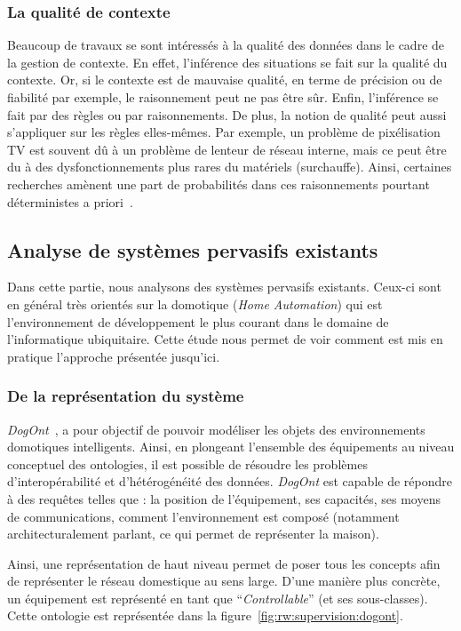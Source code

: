 \subsubsection{La qualité de contexte}
Beaucoup de travaux se sont intéressés à la qualité des données dans le cadre de la gestion de contexte. En effet, l'inférence des situations se fait sur la qualité du contexte. Or, si le contexte est de mauvaise qualité, en terme de précision ou de fiabilité par exemple, le raisonnement peut ne pas être sûr. Enfin, l'inférence se fait par des règles ou par raisonnements. De plus, la notion de qualité peut aussi s'appliquer sur les règles elles-mêmes. Par exemple, un problème de pixélisation TV est souvent dû à un problème de lenteur de réseau interne, mais ce peut être du à des dysfonctionnements plus rares du matériels (surchauffe). Ainsi, certaines recherches amènent une part de probabilités dans ces raisonnements pourtant déterministes a priori~\cite{Padovitz:agent}.

\subsection{Analyse de systèmes pervasifs existants}
Dans cette partie, nous analysons des systèmes pervasifs existants. Ceux-ci sont en général très orientés sur la domotique (\textit{Home Automation}) qui est l'environnement de développement le plus courant dans le domaine de l'informatique ubiquitaire. Cette étude nous permet de voir comment est mis en pratique l'approche présentée jusqu'ici.

\subsubsection{De la représentation du système}
\textit{DogOnt}~\cite{Bonino:dogont}, a pour objectif de pouvoir modéliser les objets des environnements domotiques intelligents. Ainsi, en plongeant l'ensemble des équipements au niveau conceptuel des ontologies, il est possible de résoudre les problèmes d'interopérabilité et d'hétérogénéité des données. \textit{DogOnt} est capable de répondre à des requêtes telles que : la position de l'équipement, ses capacités, ses moyens de communications, comment l'environnement est composé (notamment architecturalement parlant, ce qui permet de représenter la maison).

Ainsi, une représentation de haut niveau permet de poser tous les concepts afin de représenter le réseau domestique au sens large. D'une manière plus concrète, un équipement est représenté en tant que \enquote{\it Controllable} (et ses sous-classes). Cette ontologie est représentée dans la figure~\ref{fig:rw:supervision:dogont}.

